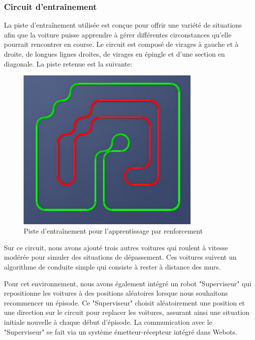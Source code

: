 \documentclass[french]{article}
\begin{document}
\subsubsection*{Circuit d'entraînement}
La piste d'entraînement utilisée est conçue pour offrir une variété de situations afin que la voiture puisse 
apprendre à gérer différentes circonstances qu'elle pourrait rencontrer en course. Le circuit est composé de virages 
à gauche et à droite, de longues lignes droites, de virages en épingle et d'une section en diagonale. 
La piste retenue est la suivante:

\begin{figure}[H]
\centering
\includegraphics[width=0.8\textwidth]{Images/Piste Entrainement.png}
\caption{Piste d'entraînement pour l'apprentissage par renforcement}
\end{figure}

Sur ce circuit, nous avons ajouté trois autres voitures qui roulent à vitesse modérée pour simuler des situations 
de dépassement. Ces voitures suivent un algorithme de conduite simple qui consiste à rester à distance des murs.

\vspace{0.5cm}
Pour cet environnement, nous avons également intégré un robot "Superviseur" qui repositionne les voitures à des 
positions aléatoires lorsque nous souhaitons recommencer un épisode. Ce "Superviseur" choisit aléatoirement 
une position et une direction sur le circuit pour replacer les voitures, assurant ainsi une situation initiale 
nouvelle à chaque début d'épisode. La communication avec le "Superviseur" se fait via un système émetteur-récepteur 
intégré dans Webots.
\end{document}
